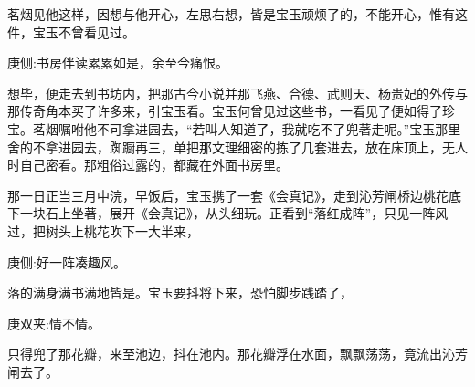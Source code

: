 \begin{parag}
    茗烟见他这样，因想与他开心，左思右想，皆是宝玉顽烦了的，不能开心，惟有这件，宝玉不曾看见过。\begin{note}庚侧:书房伴读累累如是，余至今痛恨。\end{note}想毕，便走去到书坊内，把那古今小说并那飞燕、合德、武则天、杨贵妃的外传与那传奇角本买了许多来，引宝玉看。宝玉何曾见过这些书，一看见了便如得了珍宝。茗烟嘱咐他不可拿进园去，“若叫人知道了，我就吃不了兜著走呢。”宝玉那里舍的不拿进园去，踟蹰再三，单把那文理细密的拣了几套进去，放在床顶上，无人时自己密看。那粗俗过露的，都藏在外面书房里。
\end{parag}


\begin{parag}
    那一日正当三月中浣，早饭后，宝玉携了一套《会真记》，走到沁芳闸桥边桃花底下一块石上坐著，展开《会真记》，从头细玩。正看到“落红成阵”，只见一阵风过，把树头上桃花吹下一大半来，\begin{note}庚侧:好一阵凑趣风。\end{note}落的满身满书满地皆是。宝玉要抖将下来，恐怕脚步践踏了，\begin{note}庚双夹:情不情。\end{note}只得兜了那花瓣，来至池边，抖在池内。那花瓣浮在水面，飘飘荡荡，竟流出沁芳闸去了。
\end{parag}


